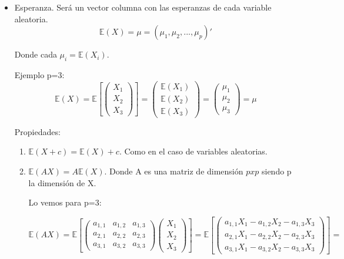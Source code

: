 \documentclass[nochap]{apuntes}
\begin{document}
\begin{itemize}
\item Esperanza. Será un vector columna con las esperanzas de cada variable aleatoria.
\[
\mathbb{E}(X) = \mu = (\mu_1, \mu_2,..., \mu_p)'
\]

Donde cada $\mu_i = \mathbb{E}(X_i)$.

Ejemplo p=3:
\[
\mathbb{E}(X)=
\mathbb{E}\left[
\left(
\begin{array}{c}
X_1\\
X_2\\
X_3
\end{array}
\right)
\right]=
\left(
\begin{array}{c}
\mathbb{E}(X_1)\\
\mathbb{E}(X_2)\\
\mathbb{E}(X_3)
\end{array}
\right)=
\left(
\begin{array}{c}
\mu_1\\
\mu_2\\
\mu_3
\end{array}
\right)=
\mu
\]

Propiedades:
\begin{enumerate}
\item $\mathbb{E}(X+c) = \mathbb{E}(X)+c$. Como en el caso de variables aleatorias.
\item $\mathbb{E}(AX) = A\mathbb{E}(X)$. Donde A es una matriz de dimensión $pxp$ siendo p la dimensión de X.

Lo vemos para p=3:

\[
\mathbb{E}(AX)=
\mathbb{E}\left[
\left(
\begin{array}{ccc}
a_{1,1}& a_{1,2}& a_{1,3}\\
a_{2,1}& a_{2,2}& a_{2,3}\\
a_{3,1}& a_{3,2}& a_{3,3}
\end{array}
\right)
\left(
\begin{array}{c}
X_1\\
X_2\\
X_3
\end{array}
\right) \right]=
\mathbb{E}\left[ 
\left(
\begin{array}{c}
a_{1,1}X_1 - a_{1,2}X_2 - a_{1,3}X_3\\
a_{2,1}X_1 - a_{2,2}X_2 - a_{2,3}X_3\\
a_{3,1}X_1 - a_{3,2}X_2 - a_{3,3}X_3
\end{array}
\right)
\right]=
\]


\end{enumerate}
\end{itemize}
\end{document}
